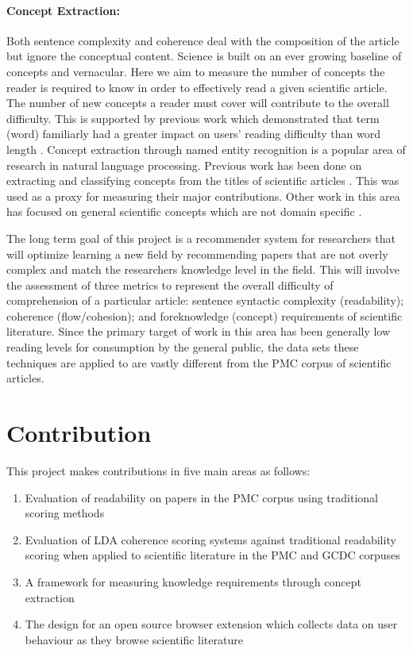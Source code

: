 \documentclass[11pt,a4paper]{article}
\begin{document}
\paragraph{Concept Extraction:}
Both sentence complexity and coherence deal with the composition of the article but ignore the conceptual content. Science is built on an ever growing baseline of concepts and vernacular. Here we aim to measure the number of concepts the reader is required to know in order to effectively read a given scientific article. The number of new concepts a reader must cover will contribute to the overall difficulty. This is supported by previous work which demonstrated that term (word) familiarly had a greater impact on users' reading difficulty than word length \cite{Leroy2014-ft}. Concept extraction through named entity recognition is a popular area of research in natural language processing. Previous work has been done on extracting and classifying concepts from the titles of scientific articles \cite{Krishnan2017-eo}. This was used as a proxy for measuring their major contributions. Other work in this area has focused on general scientific concepts which are not domain specific \cite{Brack2020-id}. 

The long term goal of this project is a recommender system for researchers that will optimize learning a new field by recommending papers that are not overly complex and match the researchers knowledge level in the field. This will involve the assessment of three metrics to represent the overall difficulty of comprehension of a particular article: sentence syntactic complexity (readability); coherence (flow/cohesion); and foreknowledge (concept) requirements of scientific literature. Since the primary target of work in this area has been generally low reading levels for consumption by the general public, the data sets these techniques are applied to are vastly different from the PMC corpus of scientific articles. 



\section{Contribution}
\label{sec:contribution}
This project makes contributions in five main areas as follows:
\begin{enumerate}
\item Evaluation of readability on papers in the PMC corpus using traditional scoring methods
\item Evaluation of LDA coherence scoring systems against traditional readability scoring when applied to scientific literature in the PMC and GCDC corpuses
\item A framework for measuring knowledge requirements through concept extraction
\item The design for an open source browser extension which collects data on user behaviour as they browse scientific literature
\end{enumerate}
\end{document}
